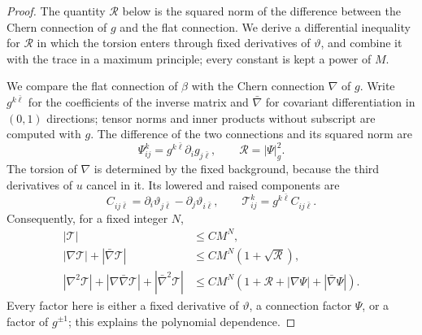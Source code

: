 \begin{proof}
The quantity $\mathcal R$ below is the squared norm of the difference between the Chern connection of $g$ and the flat connection. We derive a differential inequality for $\mathcal R$ in which the torsion enters through fixed derivatives of $\vartheta$, and combine it with the trace in a maximum principle; every constant is kept a power of $M$.

We compare the flat connection of $\beta$ with the Chern connection $\nabla$ of $g$. Write $g^{k\bar\ell}$ for the coefficients of the inverse matrix and $\bar\nabla$ for covariant differentiation in $(0,1)$ directions; tensor norms and inner products without subscript are computed with $g$. The difference of the two connections and its squared norm are
\[
  \Psi^k_{ij}=g^{k\bar\ell}\partial_i g_{j\bar\ell},
  \qquad \mathcal R=|\Psi|_g^2.
\]
The torsion of $\nabla$ is determined by the fixed background, because the third derivatives of $u$ cancel in it. Its lowered and raised components are
\begin{equation}\label{eq:interior-torsion-background}
  C_{ij\bar\ell}
  =\partial_i\vartheta_{j\bar\ell}-\partial_j\vartheta_{i\bar\ell},
  \qquad
  \mathcal T^k_{ij}=g^{k\bar\ell}C_{ij\bar\ell}.
\end{equation}
Consequently, for a fixed integer $N$,
\begin{align}
  |\mathcal T|&\leq CM^N,\nonumber\\
  |\nabla\mathcal T|+|\bar\nabla\mathcal T|
  &\leq CM^N(1+\sqrt{\mathcal R}),\label{eq:interior-torsion-derivatives}\\
  |\nabla^2\mathcal T|+|\nabla\bar\nabla\mathcal T|+|\bar\nabla^2\mathcal T|
  &\leq CM^N(1+\mathcal R+|\nabla\Psi|+|\bar\nabla\Psi|).\nonumber
\end{align}
Every factor here is either a fixed derivative of $\vartheta$, a connection factor $\Psi$, or a factor of $g^{\pm1}$; this explains the polynomial dependence.


\end{proof}
